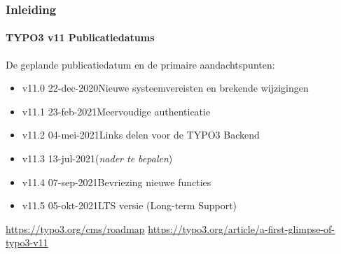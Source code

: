 %

\begin{frame}[fragile]
	\frametitle{Inleiding}
	\framesubtitle{TYPO3 v11 Publicatiedatums}

	De geplande publicatiedatum en de primaire aandachtspunten:

	\begin{itemize}
		\item
			\begingroup
				\color{typo3orange}
				v11.0 \tabto{1.1cm}22-dec-2020\tabto{3.4cm}Nieuwe systeemvereisten en brekende wijzigingen
			\endgroup
		\item v11.1 \tabto{1.1cm}23-feb-2021\tabto{3.4cm}Meervoudige authenticatie
		\item v11.2 \tabto{1.1cm}04-mei-2021\tabto{3.4cm}Links delen voor de TYPO3 Backend
		\item v11.3 \tabto{1.1cm}13-jul-2021\tabto{3.4cm}(\textit{nader te bepalen})
		\item v11.4 \tabto{1.1cm}07-sep-2021\tabto{3.4cm}Bevriezing nieuwe functies
		\item v11.5 \tabto{1.1cm}05-okt-2021\tabto{3.4cm}LTS versie (Long-term Support)

	\end{itemize}

	\smaller
		\url{https://typo3.org/cms/roadmap}\newline
		\url{https://typo3.org/article/a-first-glimpse-of-typo3-v11}
	\normalsize

\end{frame}

